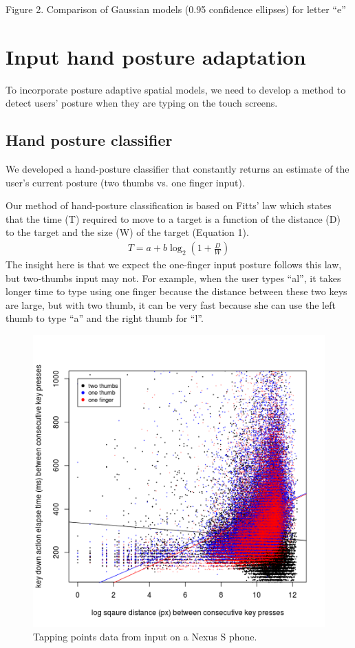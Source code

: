 \documentclass{sigchi}
\begin{document}
Figure 2. Comparison of Gaussian models (0.95 confidence ellipses) for letter “e”

\section{Input hand posture adaptation}
To incorporate posture adaptive spatial models, we need to develop a method to
detect users' posture when they are typing on the touch screens. 

\subsection{Hand posture classifier}

We developed a hand-posture classifier that constantly returns an estimate of the user's current posture (two thumbs vs. one finger input).

Our method of hand-posture classification is based on Fitts’ law which states that the time (T) required to move to a target is a function of the distance (D) to the target and the size (W) of the target (Equation 1).
\begin{align}
T = a + b\log_2(1 + \frac{D}{W})
\end{align}                                                  
The insight here is that we expect the one-finger input posture follows this law,  but two-thumbs input may not. For example, when the user types “al”, it takes longer time to type using one finger because the distance between these two keys are large, but with two thumb, it can be very fast because she can use the left thumb to type “a” and the right thumb for “l”.

\begin{figure}[tb]
  \centering
  \includegraphics[width=1\columnwidth]{figures/time-distance.png}
  \caption{Tapping points data from input on a Nexus S phone.}
  \label{fig:time-distance}
\end{figure}
\end{document}
